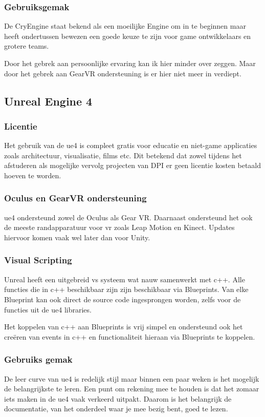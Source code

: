 \subsubsection{Gebruiksgemak}
De CryEngine staat bekend als een moeilijke Engine om in te beginnen maar heeft ondertussen bewezen een goede keuze te zijn voor game ontwikkelaars en grotere teams.

Door het gebrek aan persoonlijke ervaring kan ik hier minder over zeggen. Maar door het gebrek aan GearVR ondersteuning is er hier niet meer in verdiept.

\subsection{Unreal Engine 4}
\subsubsection{Licentie}
Het gebruik van de \gls{ue4} is compleet gratis voor educatie en niet-game applicaties zoals architectuur, visualisatie, films etc. Dit betekend dat zowel tijdens het afstuderen als mogelijke vervolg projecten van DPI er geen licentie kosten betaald hoeven te worden.

\subsubsection{Oculus en GearVR ondersteuning}
\gls{ue4} ondersteund zowel de Oculus als Gear VR. Daarnaast ondersteund het ook de meeste randapparatuur voor \gls{vr} zoals Leap Motion en Kinect. Updates hiervoor komen vaak wel later dan voor Unity.
\subsubsection{Visual Scripting}
Unreal heeft een uitgebreid \gls{vs} systeem wat nauw samenwerkt met c++. Alle functies die in c++ beschikbaar zijn zijn beschikbaar via Blueprints. Van elke Blueprint kan ook direct de source code ingesprongen worden, zelfs voor de functies uit de \gls{ue4} libraries.

Het koppelen van c++ aan Blueprints is vrij simpel en ondersteund ook het creëren van events in c++ en functionaliteit hieraan via Blueprints te koppelen.

\subsubsection{Gebruiks gemak}
De leer curve van \gls{ue4} is redelijk stijl maar binnen een paar weken is het mogelijk de belangrijkste te leren. Een punt om rekening mee te houden is dat het zomaar iets maken in de \gls{ue4} vaak verkeerd uitpakt. Daarom is het belangrijk de documentatie, van het onderdeel waar je mee bezig bent, goed te lezen.

